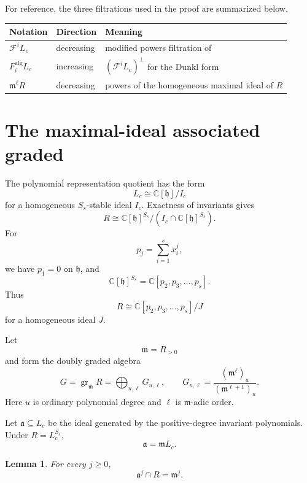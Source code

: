 \documentclass[11pt]{article}
\newtheorem{lemma}[theorem]{Lemma}
\newcommand{\C}{\mathbb{C}}
\newcommand{\gr}{\operatorname{gr}}
\newcommand{\alg}{\mathrm{alg}}
\begin{document}
For reference, the three filtrations used in the proof are summarized
below.

\begin{center}
\begin{tabular}{@{}lll@{}}
\toprule
Notation & Direction & Meaning \\
\midrule
$\mathcal F^iL_c$ & decreasing & modified powers filtration of \cite{GORS} \\
$F_i^{\alg}L_c$ & increasing & $(\mathcal F^iL_c)^\perp$ for the Dunkl form \\
$\mathfrak m^\ell R$ & decreasing & powers of the homogeneous maximal ideal of $R$ \\
\bottomrule
\end{tabular}
\end{center}

\section{The maximal-ideal associated graded}\label{sec:m-adic}

The polynomial representation quotient has the form
\[
 L_c\cong\C[\mathfrak h]/I_c
\]
for a homogeneous $S_s$-stable ideal $I_c$.  Exactness of invariants
gives
\[
 R\cong
 \C[\mathfrak h]^{S_s}/(I_c\cap\C[\mathfrak h]^{S_s}).
\]
For
\[
 p_j=\sum_{i=1}^s x_i^j,
\]
we have $p_1=0$ on $\mathfrak h$, and
\[
 \C[\mathfrak h]^{S_s}=\C[p_2,p_3,\ldots,p_s].
\]
Thus
\begin{equation}\label{eq:R-presentation}
 R\cong\C[p_2,p_3,\ldots,p_s]/J
\end{equation}
for a homogeneous ideal $J$.

Let
\[
 \mathfrak m=R_{>0}
\]
and form the doubly graded algebra
\[
 G=\gr_{\mathfrak m}R
 =\bigoplus_{u,\ell}G_{u,\ell},
 \qquad
 G_{u,\ell}
 =\frac{(\mathfrak m^\ell)_u}{(\mathfrak m^{\ell+1})_u}.
\]
Here $u$ is ordinary polynomial degree and $\ell$ is
$\mathfrak m$-adic order.

Let $\mathfrak a\subseteq L_c$ be the ideal generated by the
positive-degree invariant polynomials.  Under $R=L_c^{S_s}$,
\[
 \mathfrak a=\mathfrak mL_c.
\]

\begin{lemma}\label{lem:intersection}
For every $j\geq0$,
\begin{equation}\label{eq:intersection}
 \mathfrak a^j\cap R=\mathfrak m^j.
\end{equation}
\end{lemma}
\end{document}
